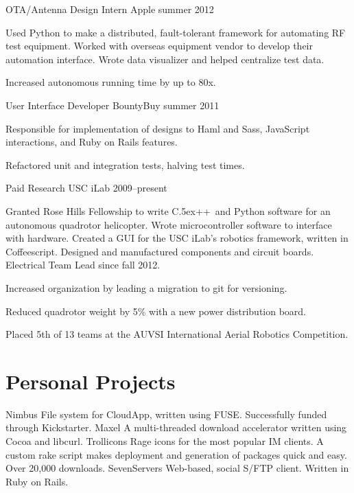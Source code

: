\documentclass[print]{friggeri-cv}
\newenvironment{itemize*}%
  {\begin{itemize}%
    \setlength{\itemsep}{0pt}%
    \setlength{\parskip}{0pt}}%
  {\end{itemize}}
\def\Cplusplus{{\rm C\raise.5ex\hbox{\small ++}}~}
\begin{document}
\workexperience
  {OTA/Antenna Design Intern}
  {Apple}
  {summer 2012}
  {
  Used Python to make a distributed, fault-tolerant framework for automating RF test equipment. Worked with overseas equipment vendor to develop their automation interface. Wrote data visualizer and helped centralize test data.
  \begin{itemize*}
    \item Increased autonomous running time by up to 80x.
  \end{itemize*}
  }

\workexperience
  {User Interface Developer}
  {BountyBuy}
  {summer 2011}
  {
  Responsible for implementation of designs to Haml and Sass, JavaScript interactions, and Ruby on Rails features.
  \begin{itemize*}
    \item Refactored unit and integration tests, halving test times.
  \end{itemize*}
  }

\workexperience
  {Paid Research}
  {USC iLab}
  {2009--present}
  {
  Granted Rose Hills Fellowship to write \Cplusplus and Python software for an autonomous quadrotor helicopter. Wrote microcontroller software to interface with hardware. Created a GUI for the USC iLab's robotics framework, written in Coffeescript. Designed and manufactured components and circuit boards. Electrical Team Lead since fall 2012.
  \begin{itemize*}
    \item Increased organization by leading a migration to git for versioning.
    \item Reduced quadrotor weight by 5\% with a new power distribution board.
    \item Placed 5th of 13 teams at the AUVSI International Aerial Robotics Competition.
  \end{itemize*}
  }

\section{Personal Projects}

\begin{entrylist}
  \project
    {Nimbus}
    {File system for CloudApp, written using FUSE. Successfully funded through Kickstarter.}
  \project
    {Maxel}
    {A multi-threaded download accelerator written using Cocoa and libcurl.}
  \project
    {Trollicons}
    {Rage icons for the most popular IM clients. A custom rake script makes deployment and generation of packages quick and easy. Over 20,000 downloads.}
  \project
    {SevenServers}
    {Web-based, social S/FTP client. Written in Ruby on Rails.}
\end{entrylist}

\nopagebreak
\end{document}
